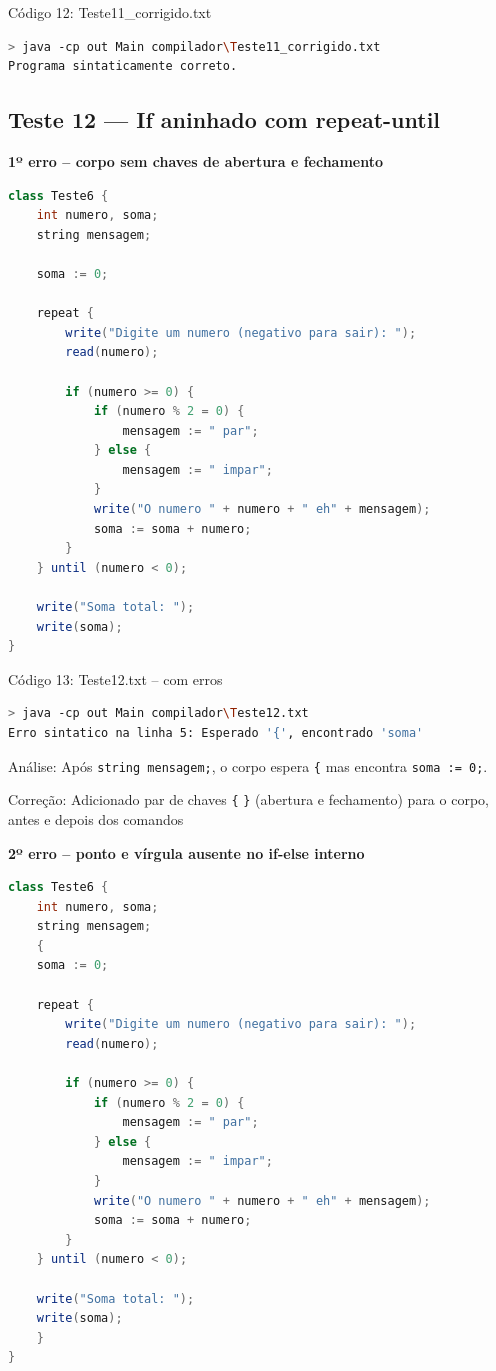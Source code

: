 \documentclass[12pt,a4paper]{article}
\begin{document}
Código 12: Teste11\_corrigido.txt

\begin{lstlisting}[language=bash]
> java -cp out Main compilador\Teste11_corrigido.txt
Programa sintaticamente correto.
\end{lstlisting}

\subsection{Teste 12 --- If aninhado com repeat-until}

\textbf{1º erro -- corpo sem chaves de abertura e fechamento}

\begin{lstlisting}[language=Java]
class Teste6 {
    int numero, soma;
    string mensagem;

    soma := 0;

    repeat {
        write("Digite um numero (negativo para sair): ");
        read(numero);

        if (numero >= 0) {
            if (numero % 2 = 0) {
                mensagem := " par";
            } else {
                mensagem := " impar";
            }
            write("O numero " + numero + " eh" + mensagem);
            soma := soma + numero;
        }
    } until (numero < 0);

    write("Soma total: ");
    write(soma);
}
\end{lstlisting}

Código 13: Teste12.txt -- com erros

\begin{lstlisting}[language=bash]
> java -cp out Main compilador\Teste12.txt
Erro sintatico na linha 5: Esperado '{', encontrado 'soma'
\end{lstlisting}

Análise: Após \texttt{string mensagem;}, o corpo espera \texttt{\{} mas encontra \texttt{soma := 0;}.

Correção: Adicionado par de chaves \texttt{\{} \texttt{\}} (abertura e fechamento) para o corpo, antes e depois dos comandos

\textbf{2º erro -- ponto e vírgula ausente no if-else interno}

\begin{lstlisting}[language=Java]
class Teste6 {
    int numero, soma;
    string mensagem;
    {
    soma := 0;

    repeat {
        write("Digite um numero (negativo para sair): ");
        read(numero);

        if (numero >= 0) {
            if (numero % 2 = 0) {
                mensagem := " par";
            } else {
                mensagem := " impar";
            }
            write("O numero " + numero + " eh" + mensagem);
            soma := soma + numero;
        }
    } until (numero < 0);

    write("Soma total: ");
    write(soma);
    }
}
\end{lstlisting}
\end{document}
